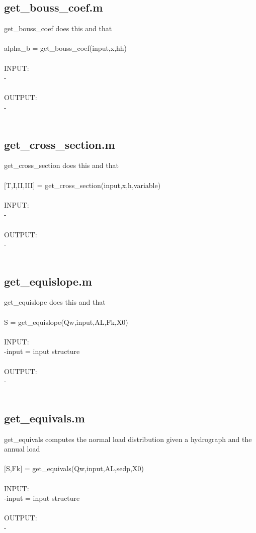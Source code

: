 \subsection{get\_bouss\_coef.m}
get\_bouss\_coef does this and that \\ 
 \\ 
alpha\_b = get\_bouss\_coef(input,x,hh) \\ 
 \\ 
INPUT: \\ 
   - \\ 
 \\ 
OUTPUT: \\ 
   - \\ 
 \\ 
\subsection{get\_cross\_section.m}
get\_cross\_section does this and that \\ 
 \\ 
$[$T,I,II,III$]$ = get\_cross\_section(input,x,h,variable) \\ 
 \\ 
INPUT: \\ 
   - \\ 
 \\ 
OUTPUT: \\ 
   - \\ 
 \\ 
\subsection{get\_equislope.m}
get\_equislope does this and that \\ 
 \\ 
S = get\_equislope(Qw,input,AL,Fk,X0) \\ 
 \\ 
INPUT: \\ 
   -input = input structure \\ 
 \\ 
OUTPUT: \\ 
   - \\ 
 \\ 
\subsection{get\_equivals.m}
get\_equivals computes the normal load distribution given a hydrograph and the annual load \\ 
 \\ 
$[$S,Fk$]$ = get\_equivals(Qw,input,AL,sedp,X0) \\ 
 \\ 
INPUT: \\ 
   -input = input structure \\ 
 \\ 
OUTPUT: \\ 
   - \\ 
 \\ 
